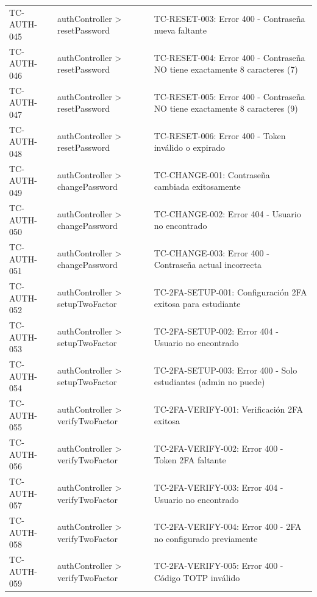 \begin{longtable}{l L{0.30\textwidth} L{0.40\textwidth}}
TC-AUTH-045 & authController > resetPassword & TC-RESET-003: Error 400 - Contraseña nueva faltante \\
TC-AUTH-046 & authController > resetPassword & TC-RESET-004: Error 400 - Contraseña NO tiene exactamente 8 caracteres (7) \\
TC-AUTH-047 & authController > resetPassword & TC-RESET-005: Error 400 - Contraseña NO tiene exactamente 8 caracteres (9) \\
TC-AUTH-048 & authController > resetPassword & TC-RESET-006: Error 400 - Token inválido o expirado \\
TC-AUTH-049 & authController > changePassword & TC-CHANGE-001: Contraseña cambiada exitosamente \\
TC-AUTH-050 & authController > changePassword & TC-CHANGE-002: Error 404 - Usuario no encontrado \\
TC-AUTH-051 & authController > changePassword & TC-CHANGE-003: Error 400 - Contraseña actual incorrecta \\
TC-AUTH-052 & authController > setupTwoFactor & TC-2FA-SETUP-001: Configuración 2FA exitosa para estudiante \\
TC-AUTH-053 & authController > setupTwoFactor & TC-2FA-SETUP-002: Error 404 - Usuario no encontrado \\
TC-AUTH-054 & authController > setupTwoFactor & TC-2FA-SETUP-003: Error 400 - Solo estudiantes (admin no puede) \\
TC-AUTH-055 & authController > verifyTwoFactor & TC-2FA-VERIFY-001: Verificación 2FA exitosa \\
TC-AUTH-056 & authController > verifyTwoFactor & TC-2FA-VERIFY-002: Error 400 - Token 2FA faltante \\
TC-AUTH-057 & authController > verifyTwoFactor & TC-2FA-VERIFY-003: Error 404 - Usuario no encontrado \\
TC-AUTH-058 & authController > verifyTwoFactor & TC-2FA-VERIFY-004: Error 400 - 2FA no configurado previamente \\
TC-AUTH-059 & authController > verifyTwoFactor & TC-2FA-VERIFY-005: Error 400 - Código TOTP inválido \\
\end{longtable}

